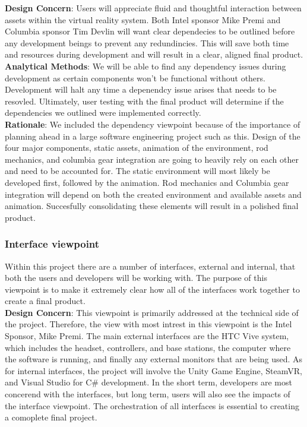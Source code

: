 \documentclass[10pt,journal,compsoc,onecolumn, draftclsnofoot]{IEEEtran}
\begin{document}
\hangindent=0.5cm \textbf{Design Concern}: Users will appreciate fluid and thoughtful interaction between assets within the virtual reality system. Both Intel sponsor Mike Premi and Columbia sponsor Tim Devlin will want clear dependecies to be outlined before any development beings to prevent any redundincies. This will save both time and resources during development and will result in a clear, aligned final product.\\

\hangindent=0.5cm \textbf{Analytical Methods}: We will be able to find any dependency issues during development as certain components won't be functional without others. Development will halt any time a depenendcy issue arises that needs to be resovled. Ultimately, user testing with the final product will determine if the dependencies we outlined were implemented correctly.\\

\hangindent=0.5cm \textbf{Rationale}: We included the dependency viewpoint because of the importance of planning ahead in a large software engineering project such as this. Design of the four major components, static assets, animation of the environment, rod mechanics, and columbia gear integration are going to heavily rely on each other and need to be accounted for. The static environment will most likely be developed first, followed by the animation. Rod mechanics and Columbia gear integration will depend on both the created environment and available assets and animation. Succesfully consolidating these elements will result in a polished final product.\\

\subsubsection{Interface viewpoint}
Within this project there are a number of interfaces, external and internal, that both the users and developers will be working with.
The purpose of this viewpoint is to make it extremely clear how all of the interfaces work together to create a final product. \\

\hangindent=0.5cm \textbf{Design Concern}: This viewpoint is primarily addressed at the technical side of the project.
Therefore, the view with most intrest in this viewpoint is the Intel Sponsor, Mike Premi.
The main external interfaces are the HTC Vive system, which includes the headset, controllers, and base stations, the computer where the software is running, and finally any external monitors that are being used.
As for internal interfaces, the project will involve the Unity Game Engine, SteamVR, and Visual Studio for C\# development.
In the short term, developers are most concerend with the interfaces, but long term, users will also see the impacts of the interface viewpoint.
The orchestration of all interfaces is essential to creating a comoplete final project. \\
\end{document}
